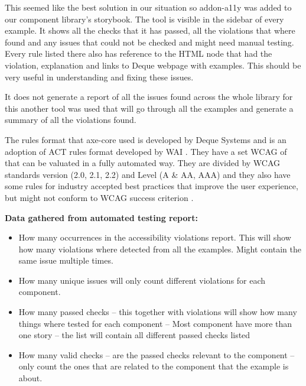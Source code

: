 \documentclass{master_thesis}
\begin{document}
This seemed like the best solution in our situation so addon-a11y was added to our component library's storybook. The tool is visible in the sidebar of every example. It shows all the checks that it has passed, all the violations that where found and any issues that could not be checked and might need manual testing. Every rule listed there also has reference to the HTML node that had the violation, explanation and links to Deque webpage with examples. This should be very useful in understanding and fixing these issues.

It does not generate a report of all the issues found across the whole library for this another tool was used that will go through all the examples and generate a summary of all the violations found.

The rules format that axe-core used is developed by Deque Systems and is an adoption of ACT rules format developed by WAI \citep{Fiers2017}. They have a set WCAG of that can be valuated in a fully automated way. They are divided  by WCAG standards version (2.0, 2.1, 2.2) and Level (A \& AA, AAA) and they also have some rules for industry accepted best practices that improve the user experience, but might not conform to WCAG success criterion \citep{Fiers2023}.

\textbf{Data gathered from automated testing report:}
\begin{itemize}
	\item How many occurrences in the accessibility violations report. This will show how many violations where detected from all the examples. Might contain the same issue multiple times.
	\item How many unique issues will only count different violations for each component.
	\item How many passed checks – this together with violations will show how many things where tested for each component – Most component have more than one story – the list will contain all different passed checks listed
	\item How many valid checks – are the passed checks relevant to the component – only count the ones that are related to the component that the example is about.
\end{itemize}

\end{document}
